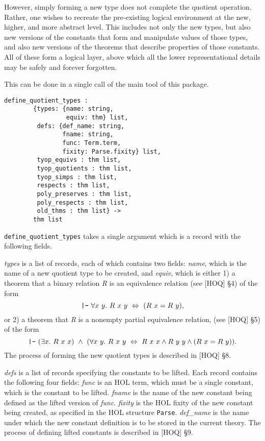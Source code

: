 However, simply forming a new type does not complete the quotient operation.
Rather, one wishes to recreate the
pre-existing logical environment at the new,
higher, and more abstract level.  This includes not only the new
types, but also new versions of the constants that form and
manipulate values of those types, and also new versions of the
theorems that describe properties of those constants.  All of these
form a logical layer, above which all the lower representational details
may be safely and forever forgotten.

This can be done in a single call of the
main tool of this package.

\begin{verbatim}
define_quotient_types :
        {types: {name: string,
                 equiv: thm} list,
         defs: {def_name: string,
                fname: string,
                func: Term.term,
                fixity: Parse.fixity} list,
         tyop_equivs : thm list,
         tyop_quotients : thm list,
         tyop_simps : thm list,
         respects : thm list,
         poly_preserves : thm list,
         poly_respects : thm list,
         old_thms : thm list} ->
        thm list
\end{verbatim}

{\tt define\_quotient\_types} takes a single argument which is a
record with the following fields.

{\it types\/} is a list of records, each of which contains two fields:
{\it name}, which is the name of a new quotient type to be created, and
{\it equiv}, which is
either 1)
a theorem that a binary relation {\it R\/}
is an equivalence relation
(see [HOQ] \S 4)
of the form
$$
\mbox{\tt |-}\
\forall x\ y.\ R\ x\ y \ \Leftrightarrow \
                (R\ x = R\ y),
$$
or 2)
a theorem that {\it R\/} is a nonempty partial equivalence relation,
(see [HOQ] \S 5)
of the form
$$
\mbox{\tt |-}\
(\exists x.\ R\ x\ x) \ \wedge \
(\forall x\ y.\ R\ x\ y \ \Leftrightarrow \
                R\ x\ x \wedge R\ y\ y \wedge (R\ x = R\ y)).
$$
The process of forming the new quotient types is described
in [HOQ] \S 8.

{\it defs\/} is a list of records specifying the constants to be lifted.
Each record contains the following four fields:
{\it func\/} is an HOL term, which must be a single constant, which is the
constant to be lifted.
{\it fname\/} is the name of the new constant being defined as the lifted version of {\it func}.
{\it fixity\/} is the HOL fixity of the new constant being created,
as specified in the HOL structure {\tt Parse}.
{\it def\_name} is the name under which the new constant definition is to
be stored in the current theory.
The
process of defining lifted constants
is described in [HOQ] \S 9.

